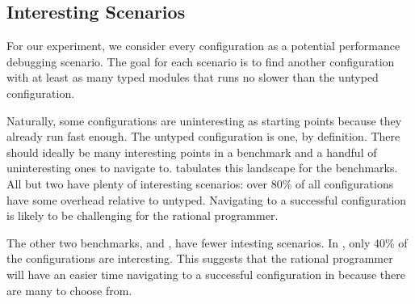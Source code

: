 \subsection{Interesting Scenarios}

For our experiment, we consider every configuration as a potential
performance debugging scenario.
The goal for each scenario is to find another configuration
with at least as many typed modules that runs no slower than the
untyped configuration.

Naturally, some configurations are uninteresting as starting
points because they already run fast enough.
The untyped configuration is one, by definition.
There should ideally be many interesting points in a benchmark
and a handful of uninteresting ones to navigate to.
 tabulates this landscape for the benchmarks.
All but two have plenty of interesting scenarios: over 80\% of
all configurations have some overhead relative to untyped.
Navigating to a successful configuration is likely to be
challenging for the rational programmer.

The other two benchmarks,  and , have
fewer intesting scenarios.
In , only 40\% of the configurations
are interesting.
This suggests that the rational programmer will have an easier
time navigating to a successful configuration in 
because there are many to choose from.


